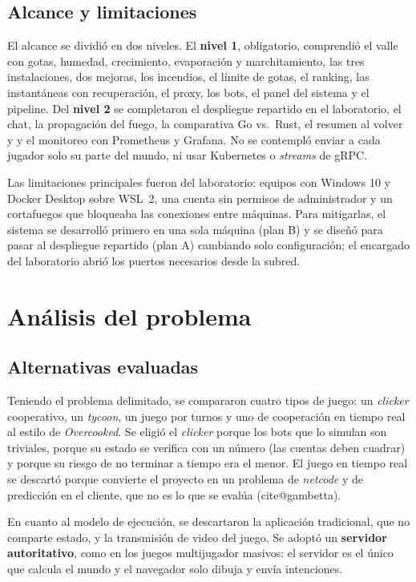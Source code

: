 \documentclass[11pt,letterpaper]{article}
\makeatletter
\newcommand{\parencite}[1]{(\csname cite@#1\endcsname)}
\makeatother
\begin{document}
\subsection{Alcance y limitaciones}

El alcance se dividió en dos niveles. El \textbf{nivel 1}, obligatorio, comprendió el valle con gotas, humedad, crecimiento, evaporación y marchitamiento, las tres instalaciones, dos mejoras, los incendios, el límite de gotas, el ranking, las instantáneas con recuperación, el proxy, los bots, el panel del sistema y el pipeline. Del \textbf{nivel 2} se completaron el despliegue repartido en el laboratorio, el chat, la propagación del fuego, la comparativa Go vs.\ Rust, el resumen al volver y y el monitoreo con Prometheus y Grafana. No se contempló enviar a cada jugador solo su parte del mundo, ni usar Kubernetes o \textit{streams} de gRPC.

Las limitaciones principales fueron del laboratorio: equipos con Windows 10 y Docker Desktop sobre WSL~2, una cuenta sin permisos de administrador y un cortafuegos que bloqueaba las conexiones entre máquinas. Para mitigarlas, el sistema se desarrolló primero en una sola máquina (plan B) y se diseñó para pasar al despliegue repartido (plan A) cambiando solo configuración; el encargado del laboratorio abrió los puertos necesarios desde la subred.

\section{Análisis del problema}

\subsection{Alternativas evaluadas}

Teniendo el problema delimitado, se compararon cuatro tipos de juego: un \textit{clicker} cooperativo, un \textit{tycoon}, un juego por turnos y uno de cooperación en tiempo real al estilo de \textit{Overcooked}. Se eligió el \textit{clicker} porque los bots que lo simulan son triviales, porque su estado se verifica con un número (las cuentas deben cuadrar) y porque su riesgo de no terminar a tiempo era el menor. El juego en tiempo real se descartó porque convierte el proyecto en un problema de \textit{netcode} y de predicción en el cliente, que no es lo que se evalúa \parencite{gambetta}.

En cuanto al modelo de ejecución, se descartaron la aplicación tradicional, que no comparte estado, y la transmisión de video del juego. Se adoptó un \textbf{servidor autoritativo}, como en los juegos multijugador masivos: el servidor es el único que calcula el mundo y el navegador solo dibuja y envía intenciones.
\end{document}

